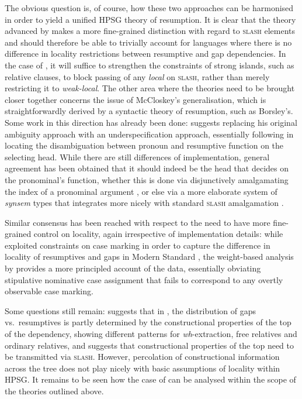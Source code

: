 \documentclass[output=paper,biblatex,babelshorthands,newtxmath,draftmode,colorlinks,citecolor=brown]{langscibook}
\begin{document}
The obvious question is, of course, how these two approaches can be
harmonised in order to yield a unified HPSG theory of resumption.  It
is clear that the theory advanced by \citet{Crysmann:12} makes a more
fine-grained distinction with regard to \textsc{slash} elements and
should therefore be able to trivially account for languages where
there is no difference in locality restrictions between resumptive and
gap dependencies. In the case of , it will suffice to strengthen
the constraints of strong islands, such as relative clauses, to block
passing of any \textit{local} on \textsc{slash}, rather than merely
restricting it to \textit{weak-local}. The other area where the theories
need to be brought closer together concerns the issue of McCloskey's
generalisation, which is straightforwardly derived by a syntactic
theory of resumption, such as Borsley's. Some work in this direction
has already been done: \citet{Crysmann:16} suggests replacing his
original ambiguity approach with an underspecification approach,
essentially following \citet{Borsley.2010} in locating the
disambiguation between pronoun and resumptive function on the
selecting head. While there are still differences of implementation,
general agreement has been obtained that it should indeed be the head
that decides on the pronominal's function, whether this is done via
disjunctively amalgamating the index of a pronominal argument
\citep{Borsley.2010,Alotaibi:Borsley:13}, or else via a more elaborate
system of \textit{synsem} types that integrates more nicely with
standard \textsc{slash} amalgamation \citep{Crysmann:16}.

Similar consensus has been reached with respect to the need to have
more fine-grained control on locality, again irrespective of
implementation details: while \citet{Alotaibi:Borsley:13} exploited
constraints on case marking in order to capture the difference in
locality of resumptives and gaps in Modern Standard , the
weight-based analysis by \citet{Crysmann:17} provides a more
principled account of the data, essentially obviating stipulative
nominative case assignment that fails to correspond to any overtly
observable case marking.

Some questions still remain: \citet[Section~6.5]{Taghvaipour2005a}
suggests that in , the distribution of gaps vs.\ resumptives is
partly determined by the constructional properties of the top of the
dependency, showing different patterns for \emph{wh}-extraction, free
relatives and ordinary relatives, and suggests that constructional
properties of the top need to be transmitted via \textsc{slash}.
However, percolation of constructional information across the tree
does not play nicely with basic assumptions of locality within
HPSG. It remains to be seen how the case of  can be analysed
within the scope of the theories outlined above.
\end{document}
